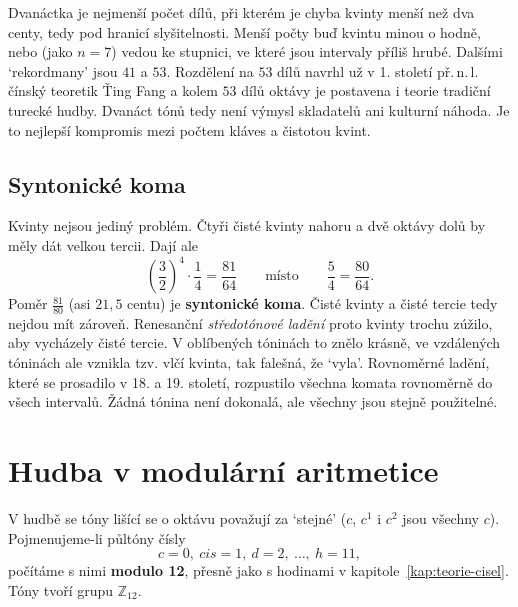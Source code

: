 Dvanáctka je nejmenší počet dílů, při kterém je chyba kvinty menší než dva centy, tedy pod hranicí slyšitelnosti. Menší počty buď kvintu minou o hodně, nebo (jako $n = 7$) vedou ke stupnici, ve které jsou intervaly příliš hrubé. Dalšími `rekordmany' jsou $41$ a $53$. Rozdělení na $53$ dílů navrhl už v 1. století př.\,n.\,l. čínský teoretik Ťing Fang a kolem $53$ dílů oktávy je postavena i teorie tradiční turecké hudby. Dvanáct tónů tedy není výmysl skladatelů ani kulturní náhoda. Je to nejlepší kompromis mezi počtem kláves a čistotou kvint.

\subsection*{Syntonické koma}

Kvinty nejsou jediný problém. Čtyři čisté kvinty nahoru a dvě oktávy dolů by měly dát velkou tercii. Dají ale
\begin{equation*}
  {\left(\frac{3}{2}\right)}^4\cdot\frac{1}{4} = \frac{81}{64}\qquad\text{místo}\qquad\frac{5}{4} = \frac{80}{64}.
\end{equation*}
Poměr $\frac{81}{80}$ (asi $21{,}5$ centu) je \textbf{syntonické koma}. Čisté kvinty a čisté tercie tedy nejdou mít zároveň. Renesanční \textit{středotónové ladění} proto kvinty trochu zúžilo, aby vycházely čisté tercie. V oblíbených tóninách to znělo krásně, ve vzdálených tóninách ale vznikla tzv. vlčí kvinta, tak falešná, že `vyla'. Rovnoměrné ladění, které se prosadilo v 18. a 19. století, rozpustilo všechna komata rovnoměrně do všech intervalů. Žádná tónina není dokonalá, ale všechny jsou stejně použitelné.

\section{Hudba v modulární aritmetice}

V hudbě se tóny lišící se o oktávu považují za `stejné' ($c$, $c^1$ i $c^2$ jsou všechny $c$). Pojmenujeme-li půltóny čísly
\begin{equation*}
  c = 0,\ cis = 1,\ d = 2,\ \dots,\ h = 11,
\end{equation*}
počítáme s nimi \textbf{modulo 12}, přesně jako s hodinami v kapitole~\ref{kap:teorie-cisel}. Tóny tvoří grupu $\mathbb{Z}_{12}$.

\begin{center}
\end{center}

